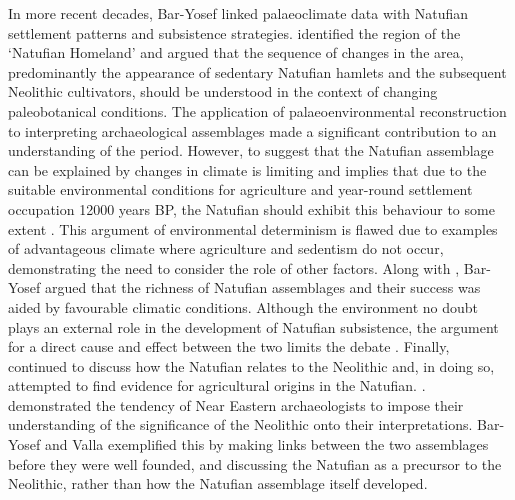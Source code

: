 In more recent decades, Bar-Yosef linked palaeoclimate data with Natufian settlement patterns and subsistence strategies. \textcite[157]{Bar-Yosef_1998} identified the region of the ‘Natufian Homeland’ and argued that the sequence of changes in the area, predominantly the appearance of sedentary Natufian hamlets and the subsequent Neolithic cultivators, should be understood in the context of changing paleobotanical conditions. The application of palaeoenvironmental reconstruction to interpreting archaeological assemblages made a significant contribution to an understanding of the period. 
However, to suggest that the Natufian assemblage can be explained by changes in climate is limiting and implies that due to the suitable environmental conditions for agriculture and year-round settlement occupation \num{12000} years BP, the Natufian should exhibit this behaviour to some extent \parencite[161]{Bar-Yosef_1998}. This argument of environmental determinism is flawed due to examples of advantageous climate where agriculture and sedentism do not occur, demonstrating the need to consider the role of other factors. 
Along with \textcite{Valla_1999}, Bar-Yosef argued that the richness of Natufian assemblages and their success was aided by favourable climatic conditions. 
Although the environment no doubt plays an external role in the development of Natufian subsistence, the argument for a direct cause and effect between the two limits the debate \parencite{Fletcher_2007}. 
Finally, \textcite[175]{Bar-Yosef_2011} continued to discuss how the Natufian relates to the Neolithic and, in doing so, attempted to find evidence for agricultural origins in the Natufian. 
\textcite{Finlayson_2013}.
demonstrated the tendency of Near Eastern archaeologists to impose their understanding of the significance of the Neolithic onto their interpretations. Bar-Yosef and Valla exemplified this by making links between the two assemblages before they were well founded, and discussing the Natufian as a precursor to the Neolithic, rather than how the Natufian assemblage itself developed. 

